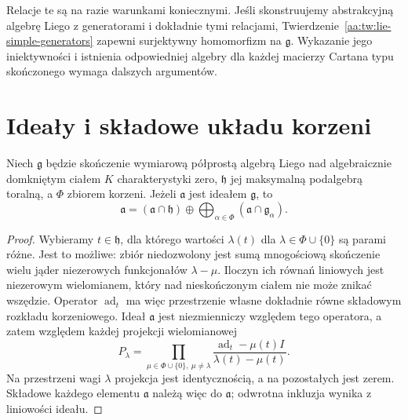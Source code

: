 \begin{uwaga}
Relacje te są na razie warunkami koniecznymi. Jeśli skonstruujemy abstrakcyjną algebrę Liego z generatorami i dokładnie tymi relacjami, Twierdzenie~\ref{aa:tw:lie-simple-generators} zapewni surjektywny homomorfizm na $\mathfrak g$. Wykazanie jego iniektywności i istnienia odpowiedniej algebry dla każdej macierzy Cartana typu skończonego wymaga dalszych argumentów.
\end{uwaga}

\section{Ideały i składowe układu korzeni}

\begin{lemat}
\label{aa:lem:lie-ideal-weight-components}
Niech $\mathfrak g$ będzie skończenie wymiarową półprostą algebrą Liego nad algebraicznie domkniętym ciałem $K$ charakterystyki zero, $\mathfrak h$ jej maksymalną podalgebrą toralną, a $\Phi$ zbiorem korzeni. Jeżeli $\mathfrak a$ jest ideałem $\mathfrak g$, to
\[
 \mathfrak a=(\mathfrak a\cap\mathfrak h)\oplus
 \bigoplus_{\alpha\in\Phi}(\mathfrak a\cap\mathfrak g_\alpha).
\]
\end{lemat}
\begin{proof}
Wybieramy $t\in\mathfrak h$, dla którego wartości $\lambda(t)$ dla $\lambda\in\Phi\cup\{0\}$ są parami różne. Jest to możliwe: zbiór niedozwolony jest sumą mnogościową skończenie wielu jąder niezerowych funkcjonałów $\lambda-\mu$. Iloczyn ich równań liniowych jest niezerowym wielomianem, który nad nieskończonym ciałem nie może znikać wszędzie. Operator $\operatorname{ad}_t$ ma więc przestrzenie własne dokładnie równe składowym rozkładu korzeniowego. Ideał $\mathfrak a$ jest niezmienniczy względem tego operatora, a zatem względem każdej projekcji wielomianowej
\[
 P_\lambda=\prod_{\mu\in\Phi\cup\{0\},\ \mu\ne\lambda}
 \frac{\operatorname{ad}_t-\mu(t)I}{\lambda(t)-\mu(t)}.
\]
Na przestrzeni wagi $\lambda$ projekcja jest identycznością, a na pozostałych jest zerem. Składowe każdego elementu $\mathfrak a$ należą więc do $\mathfrak a$; odwrotna inkluzja wynika z liniowości ideału.
\end{proof}

